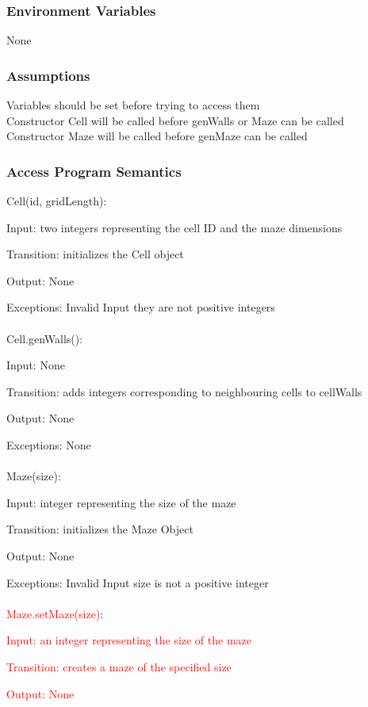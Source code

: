 \documentclass[12pt, titlepage]{article}
\begin{document}
		\subsubsection{Environment Variables}
		None
		
		\subsubsection{Assumptions}
		Variables should be set before trying to access them \\ 
		Constructor Cell will be called before genWalls or Maze can be called \\
	    Constructor Maze will be called before genMaze can be called
		
		\subsubsection{Access Program Semantics}
		Cell(id, gridLength):
		
		Input: two integers representing the cell ID and the maze dimensions
		
		Transition: initializes the Cell object
		
		Output: None
		
		Exceptions: Invalid Input they are not positive integers\\
		\\
		Cell.genWalls():
		
		Input: None
		
		Transition: adds integers corresponding to neighbouring cells to cellWalls
		
		Output: None
		
		Exceptions: None\\
		\\
		Maze(size):
		
		Input: integer representing the size of the maze
		
		Transition: initializes the Maze Object
		
		Output: None
		
		Exceptions: Invalid Input size is not a positive integer\\
		\\
		\textcolor{red}{Maze.setMaze(size)}:
		
		\textcolor{red}{Input: an integer representing the size of the maze}
		
		\textcolor{red}{Transition: creates a maze of the specified size}
		
		\textcolor{red}{Output: None}
		
\end{document}
